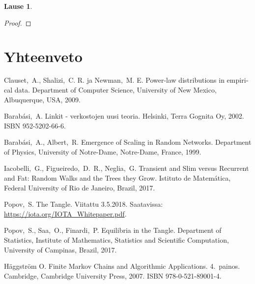 \documentclass[finnish, 12pt, a4paper, sci, utf8, pdfa]{aaltothesis}
\newtheorem{theorem}{Lause}
\begin{document}
\begin{theorem}

\end{theorem}

\begin{proof}

\end{proof}

\section{Yhteenveto}

\clearpage

\thesisbibliography

\begin{thebibliography}{99}

 Clauset,\ A., Shalizi,\ C. R. ja Newman,\ M. E. 
   \foreignlanguage{english}{Power-law distributions in empirical data.} 
   Department of Computer Science, University of New Mexico, Albuquerque, USA, 2009.

 Barabási,\ A. Linkit - verkostojen uusi teoria. 
   Helsinki, Terra Gognita Oy, 2002. ISBN 952-5202-66-6. 

 Barabási,\ A., Albert,\ R.
   \foreignlanguage{english}{Emergence of Scaling in Random Networks.} 
   Department of Physics, University of Notre-Dame, Notre-Dame, France, 1999.

 Iacobelli,\ G., Figueiredo,\ D.\ R., Neglia,\ G. 
   \foreignlanguage{english}{Transient and Slim versus Recurrent and Fat: Random Walks and the Trees they Grow.} 
   Istituto de Matemática, Federal University of Rio de Janeiro, Brazil, 2017.

 Popov,\ S. The Tangle. Viitattu 3.5.2018. Saatavissa: \url{https://iota.org/IOTA_Whitepaper.pdf}.

 Popov,\ S., Saa,\ O., Finardi,\ P. 
   \foreignlanguage{english}{Equilibria in the Tangle.} 
   Department of Statistics, Institute of Mathematics, Statistics and Scientific Computation, University of Campinas, Brazil, 2017.

 Häggström O.
   \foreignlanguage{english}{Finite Markov Chains and Algorithmic Applications.} 
   4.\ painos. Cambridge, Cambridge University Press, 2007. ISBN 978-0-521-89001-4.

\end{thebibliography}
\end{document}
